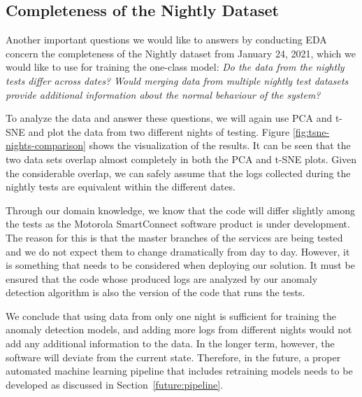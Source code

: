 \subsection{Completeness of the Nightly Dataset}
\label{assumption-completeness}

Another important questions we would like to answers by conducting EDA concern the completeness of the Nightly dataset from January 24, 2021, which we would like to use for training the one-class model: \textit{Do the data from the nightly tests differ across dates?} \textit{Would merging data from multiple nightly test datasets provide additional information about the normal behaviour of the system?}

To analyze the data and answer these questions, we will again use PCA and t-SNE and plot the data from two different nights of testing. Figure \ref{fig:tsne-nights-comparison} shows the visualization of the results. It can be seen that the two data sets overlap almost completely in both the PCA and t-SNE plots. Given the considerable overlap, we can safely assume that the logs collected during the nightly tests are equivalent within the different dates.

Through our domain knowledge, we know that the code will differ slightly among the tests as the Motorola SmartConnect software product is under development. The reason for this is that the master branches of the services are being tested and we do not expect them to change dramatically from day to day. 
However, it is something that needs to be considered when deploying our solution. It must be ensured that the code whose produced logs are analyzed by our anomaly detection algorithm is also the version of the code that runs the tests.

We conclude that using data from only one night is sufficient for training the anomaly detection models, and adding more logs from different nights would not add any additional information to the data. In the longer term, however, the software will deviate from the current state. Therefore, in the future, a proper automated machine learning pipeline that includes retraining models needs to be developed as discussed in Section~\ref{future:pipeline}.

